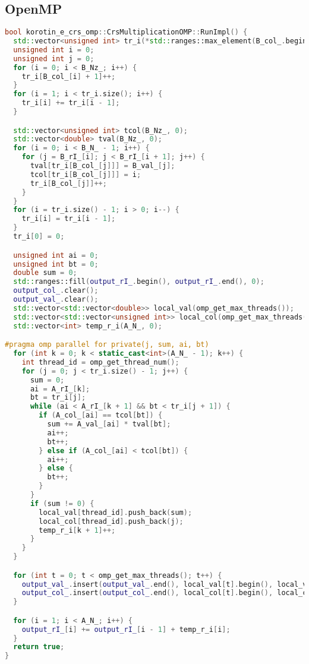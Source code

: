 \documentclass[a4paper,12pt]{article}
\begin{document}
\subsection{OpenMP}
\begin{lstlisting}[language=C++]
bool korotin_e_crs_omp::CrsMultiplicationOMP::RunImpl() {
  std::vector<unsigned int> tr_i(*std::ranges::max_element(B_col_.begin(), B_col_.end()) + 2, 0);
  unsigned int i = 0;
  unsigned int j = 0;
  for (i = 0; i < B_Nz_; i++) {
    tr_i[B_col_[i] + 1]++;
  }
  for (i = 1; i < tr_i.size(); i++) {
    tr_i[i] += tr_i[i - 1];
  }

  std::vector<unsigned int> tcol(B_Nz_, 0);
  std::vector<double> tval(B_Nz_, 0);
  for (i = 0; i < B_N_ - 1; i++) {
    for (j = B_rI_[i]; j < B_rI_[i + 1]; j++) {
      tval[tr_i[B_col_[j]]] = B_val_[j];
      tcol[tr_i[B_col_[j]]] = i;
      tr_i[B_col_[j]]++;
    }
  }
  for (i = tr_i.size() - 1; i > 0; i--) {
    tr_i[i] = tr_i[i - 1];
  }
  tr_i[0] = 0;

  unsigned int ai = 0;
  unsigned int bt = 0;
  double sum = 0;
  std::ranges::fill(output_rI_.begin(), output_rI_.end(), 0);
  output_col_.clear();
  output_val_.clear();
  std::vector<std::vector<double>> local_val(omp_get_max_threads());
  std::vector<std::vector<unsigned int>> local_col(omp_get_max_threads());
  std::vector<int> temp_r_i(A_N_, 0);

#pragma omp parallel for private(j, sum, ai, bt)
  for (int k = 0; k < static_cast<int>(A_N_ - 1); k++) {
    int thread_id = omp_get_thread_num();
    for (j = 0; j < tr_i.size() - 1; j++) {
      sum = 0;
      ai = A_rI_[k];
      bt = tr_i[j];
      while (ai < A_rI_[k + 1] && bt < tr_i[j + 1]) {
        if (A_col_[ai] == tcol[bt]) {
          sum += A_val_[ai] * tval[bt];
          ai++;
          bt++;
        } else if (A_col_[ai] < tcol[bt]) {
          ai++;
        } else {
          bt++;
        }
      }
      if (sum != 0) {
        local_val[thread_id].push_back(sum);
        local_col[thread_id].push_back(j);
        temp_r_i[k + 1]++;
      }
    }
  }

  for (int t = 0; t < omp_get_max_threads(); t++) {
    output_val_.insert(output_val_.end(), local_val[t].begin(), local_val[t].end());
    output_col_.insert(output_col_.end(), local_col[t].begin(), local_col[t].end());
  }

  for (i = 1; i < A_N_; i++) {
    output_rI_[i] += output_rI_[i - 1] + temp_r_i[i];
  }
  return true;
}
\end{lstlisting}
\end{document}
